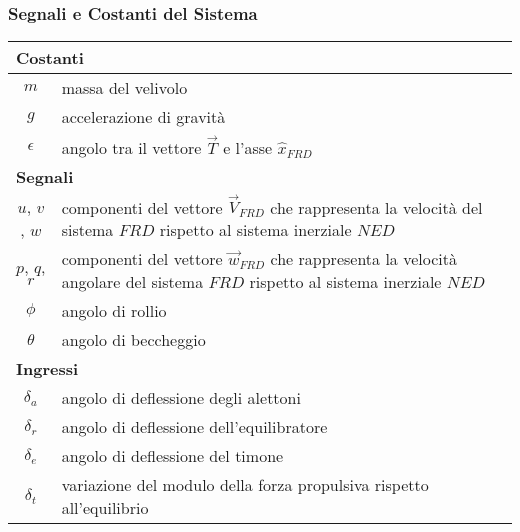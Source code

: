 \subsubsection{Segnali e Costanti del Sistema}
\renewcommand{\arraystretch}{1.2}
\begin{table}[H]
    \begin{tabularx}{\textwidth}{|c|X|}
        \hline
        \multicolumn{2}{|l|}{\textbf{Costanti}}                                                                                                           \\
        \hline
        $m$           & massa del velivolo                                                                                                                \\
        $g$           & accelerazione di gravità                                                                                                          \\
        $\epsilon$    & angolo tra il vettore $\vec{T}$ e l'asse $\hat{x}_{FRD}$                                                                          \\
        \hline
        \multicolumn{2}{|l|}{\textbf{Segnali}}                                                                                                            \\
        \hline
        $u$, $v$, $w$ & componenti del vettore $\vec{V}_{FRD}$ che rappresenta la velocità del sistema $FRD$ rispetto al sistema inerziale $NED$          \\
        $p$, $q$, $r$ & componenti del vettore $\vec{w}_{FRD}$ che rappresenta la velocità angolare del sistema $FRD$ rispetto al sistema inerziale $NED$ \\
        $\phi$        & angolo di rollio                                                                                                                  \\
        $\theta$      & angolo di beccheggio                                                                                                              \\
        \hline
        \multicolumn{2}{|l|}{\textbf{Ingressi}}                                                                                                           \\
        \hline
        $\delta_a$    & angolo di deflessione degli alettoni                                                                                              \\
        $\delta_r$    & angolo di deflessione dell'equilibratore                                                                                          \\
        $\delta_e$    & angolo di deflessione del timone                                                                                                  \\
        $\delta_t$    & variazione del modulo della forza propulsiva rispetto all'equilibrio                                                              \\
        \hline
    \end{tabularx}
\end{table}

